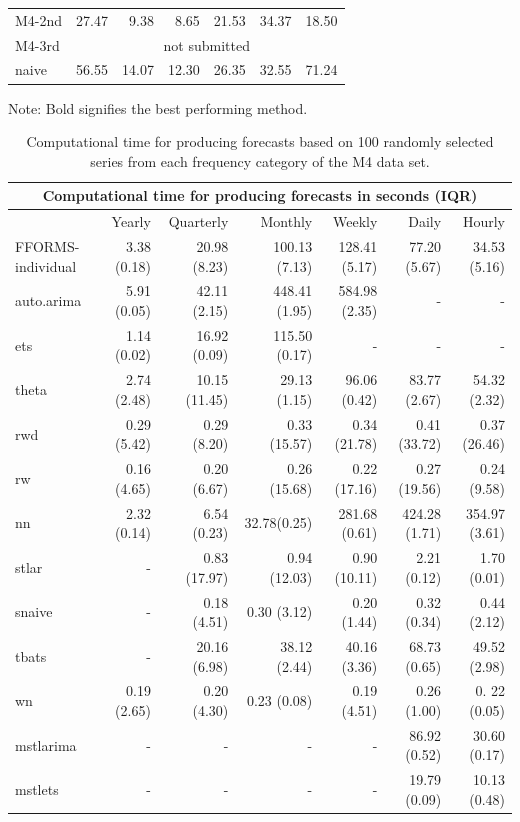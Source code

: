 \documentclass[11pt,a4paper,]{article}
\begin{document}
\begin{table}[!h]
\begin{threeparttable}
\begin{tabular}{l|rrrrrr}
M4-2nd & 27.47 & 9.38 &  8.65& 21.53 & 34.37 & 18.50\\
M4-3rd & \multicolumn{6}{c}{not submitted}\\
naive & 56.55 & 14.07 &  12.30 & 26.35 & 32.55 & 71.24\\\hline
\end{tabular}
  \begin{tablenotes}
      \scriptsize
      \item Note: Bold signifies the best performing method.
    \end{tablenotes}
  \end{threeparttable}
\end{table}

\begin{table}[!h]
\centering\scriptsize\tabcolsep=0.12cm
\caption{Computational time for producing forecasts based on 100 randomly selected series from each frequency category of the M4 data set.}
\label{forecasttime}
\begin{tabular}{l|rrrrrr}
\hline
\multicolumn{7}{c}{Computational time for producing forecasts in seconds (IQR)} \\\hline
 & Yearly & Quarterly & Monthly & Weekly & Daily & Hourly \\\hline
FFORMS-individual & 3.38 (0.18) & 20.98 (8.23)  &  100.13 (7.13) & 128.41 (5.17)  & 77.20 (5.67) & 34.53 (5.16) \\
auto.arima & 5.91 (0.05)  &  42.11 (2.15)& 448.41 (1.95) & 584.98 (2.35) &  -& - \\
ets & 1.14 (0.02) & 16.92 (0.09) & 115.50 (0.17) &  -&-  &  -\\
theta & 2.74 (2.48) & 10.15 (11.45) & 29.13 (1.15) & 96.06 (0.42) & 83.77 (2.67) & 54.32 (2.32) \\
rwd & 0.29 (5.42) & 0.29 (8.20) & 0.33 (15.57)  & 0.34 (21.78)  & 0.41 (33.72)  & 0.37 (26.46) \\
rw & 0.16 (4.65) & 0.20 (6.67) & 0.26 (15.68)   & 0.22 (17.16) &0.27 (19.56)  & 0.24 (9.58)\\
nn & 2.32 (0.14) & 6.54 (0.23) & 32.78(0.25) &281.68 (0.61) & 424.28 (1.71) & 354.97 (3.61) \\
stlar & - & 0.83 (17.97) & 0.94 (12.03) & 0.90 (10.11) & 2.21 (0.12) & 1.70 (0.01) \\
snaive & - & 0.18 (4.51) & 0.30 (3.12) & 0.20 (1.44) & 0.32 (0.34) & 0.44 (2.12) \\
tbats & - & 20.16 (6.98) & 38.12 (2.44) & 40.16 (3.36) & 68.73 (0.65) & 49.52 (2.98) \\
wn & 0.19 (2.65) & 0.20 (4.30) & 0.23 (0.08) & 0.19 (4.51) & 0.26 (1.00) & 0. 22 (0.05) \\
mstlarima & - & - &  - & - & 86.92 (0.52) & 30.60 (0.17) \\
mstlets & - &  - &  - &  - & 19.79 (0.09) & 10.13 (0.48)\\\hline
\end{tabular}
\end{table}
\end{document}
